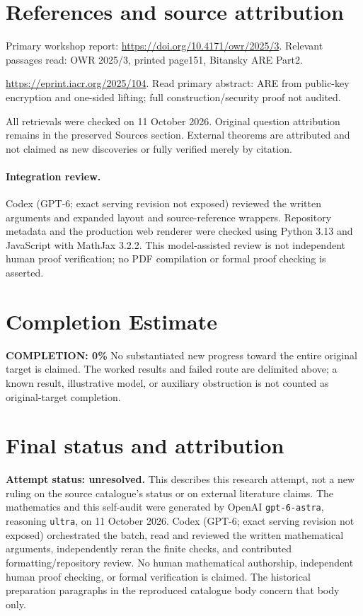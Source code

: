 \documentclass[11pt]{article}
\begin{document}
\section{References and source attribution}
Primary workshop report: \url{https://doi.org/10.4171/owr/2025/3}. Relevant passages read: OWR 2025/3, printed page151, Bitansky ARE Part2.

\url{https://eprint.iacr.org/2025/104}. Read primary abstract: ARE from public-key encryption and one-sided lifting; full construction/security proof not audited.

All retrievals were checked on 11 October 2026. Original question attribution remains in the preserved Sources section. External theorems are attributed and not claimed as new discoveries or fully verified merely by citation.


\paragraph{Integration review.} Codex (GPT-6; exact serving revision not exposed) reviewed the written arguments and expanded layout and source-reference wrappers. Repository metadata and the production web renderer were checked using Python 3.13 and JavaScript with MathJax 3.2.2. This model-assisted review is not independent human proof verification; no PDF compilation or formal proof checking is asserted.

\section{Completion Estimate}
\noindent\textbf{COMPLETION: 0\%}
No substantiated new progress toward the entire original target is claimed. The worked results and failed route are delimited above; a known result, illustrative model, or auxiliary obstruction is not counted as original-target completion.

\section{Final status and attribution}
\textbf{Attempt status: unresolved.} This describes this research attempt, not a new ruling on the source catalogue's status or on external literature claims.
The mathematics and this self-audit were generated by OpenAI \texttt{gpt-6-astra}, reasoning \texttt{ultra}, on 11 October 2026. Codex (GPT-6; exact serving revision not exposed) orchestrated the batch, read and reviewed the written mathematical arguments, independently reran the finite checks, and contributed formatting/repository review. No human mathematical authorship, independent human proof checking, or formal verification is claimed. The historical preparation paragraphs in the reproduced catalogue body concern that body only.
\end{document}
